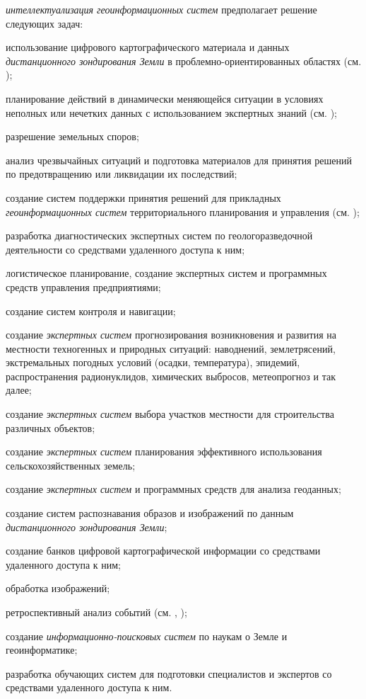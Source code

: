 \textit{интеллектуализация геоинформационных систем} предполагает решение следующих задач:
\begin{textitemize}
	\item использование цифрового картографического материала и данных \textit{дистанционного зондирования Земли} в проблемно-ориентированных областях (см. );
	\item планирование действий в динамически меняющейся ситуации в условиях неполных или нечетких данных с использованием экспертных знаний (см. ); 
	\item разрешение земельных споров;
	\item анализ чрезвычайных ситуаций и подготовка материалов для принятия решений по предотвращению или ликвидации их последствий; 
	\item создание систем поддержки принятия решений для прикладных \textit{геоинформационных систем} территориального планирования и управления (см. ); 
	\item разработка диагностических экспертных систем по геологоразведочной деятельности со средствами удаленного доступа к ним;
	\item логистическое планирование, создание экспертных систем и программных средств управления предприятиями;
	\item создание систем контроля и навигации;
	\item создание \textit{экспертных систем} прогнозирования возникновения и развития на местности техногенных и природных ситуаций: наводнений, землетрясений, экстремальных погодных условий (осадки, температура), эпидемий, распространения радионуклидов, химических выбросов, метеопрогноз и так далее;
	\item создание \textit{экспертных систем} выбора участков местности для строительства различных объектов;
	\item создание \textit{экспертных систем} планирования эффективного использования сельскохозяйственных земель;
	\item создание \textit{экспертных систем} и программных средств для анализа геоданных;
	\item создание систем распознавания образов и изображений по данным \textit{дистанционного зондирования Земли};
	\item создание банков цифровой картографической информации со средствами удаленного доступа к ним;
	\item обработка изображений;
	\item ретроспективный анализ событий (см. , );
	\item создание \textit{информационно-поисковых систем} по наукам о Земле и геоинформатике;
	\item разработка обучающих систем для подготовки специалистов и экспертов со средствами удаленного доступа к ним.
\end{textitemize}

